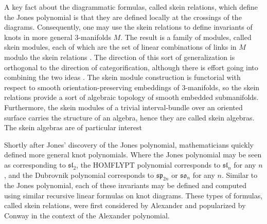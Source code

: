 A key fact about the diagrammatic formulas, called skein relations, which define the Jones polynomial is that they are defined locally at the crossings of the diagrams. Consequently, one may use the skein relations to define invariants of knots in more general $3$-manifolds $M$. The result is a family of modules, called skein modules, each of which are the set of linear combinations of links in $M$ modulo the skein relations \cite{Prz91}. The direction of this sort of generalization is orthogonal to the direction of categorification, although there is effort going into combining the two ideas \cite{APS04}. The skein module construction is functorial with respect to smooth orientation-preserving embeddings of $3$-manifolds, so the skein relations provide a sort of algebraic topology of smooth embedded submanifolds. Furthermore, the skein modules of a trivial interval-bundle over an oriented surface carries the structure of an algebra, hence they are called skein algebras. The skein algebras are of particular interest


Shortly after Jones' discovery of the Jones polynomial, mathematicians quickly defined more general knot polynomials. Where the Jones polynomial may be seen as corresponding to $\mathfrak{sl}_2$, the HOMFLYPT polynomial \cite{FHLMOY85} \cite{PT88} corresponds to $\mathfrak{sl}_n$ for any $n$, and the Dubrovnik polynomial \cite{Kau90} corresponds to $\mathfrak{sp}_{2n}$ or $\mathfrak{so}_n$ for any $n$. Similar to the Jones polynomial, each of these invariants may be defined and computed using similar recursive linear formulas on knot diagrams. These types of formulas, called skein relations, were first considered by Alexander \cite{Ale28} and popularized by Conway \cite{Con70} in the context of the Alexander polynomial. 